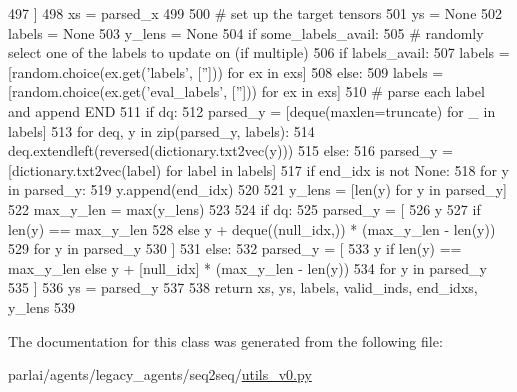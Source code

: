 \begin{DoxyCode}
497             ]
498         xs = parsed\_x
499 
500         \textcolor{comment}{# set up the target tensors}
501         ys = \textcolor{keywordtype}{None}
502         labels = \textcolor{keywordtype}{None}
503         y\_lens = \textcolor{keywordtype}{None}
504         \textcolor{keywordflow}{if} some\_labels\_avail:
505             \textcolor{comment}{# randomly select one of the labels to update on (if multiple)}
506             \textcolor{keywordflow}{if} labels\_avail:
507                 labels = [random.choice(ex.get(\textcolor{stringliteral}{'labels'}, [\textcolor{stringliteral}{''}])) \textcolor{keywordflow}{for} ex \textcolor{keywordflow}{in} exs]
508             \textcolor{keywordflow}{else}:
509                 labels = [random.choice(ex.get(\textcolor{stringliteral}{'eval\_labels'}, [\textcolor{stringliteral}{''}])) \textcolor{keywordflow}{for} ex \textcolor{keywordflow}{in} exs]
510             \textcolor{comment}{# parse each label and append END}
511             \textcolor{keywordflow}{if} dq:
512                 parsed\_y = [deque(maxlen=truncate) \textcolor{keywordflow}{for} \_ \textcolor{keywordflow}{in} labels]
513                 \textcolor{keywordflow}{for} deq, y \textcolor{keywordflow}{in} zip(parsed\_y, labels):
514                     deq.extendleft(reversed(dictionary.txt2vec(y)))
515             \textcolor{keywordflow}{else}:
516                 parsed\_y = [dictionary.txt2vec(label) \textcolor{keywordflow}{for} label \textcolor{keywordflow}{in} labels]
517             \textcolor{keywordflow}{if} end\_idx \textcolor{keywordflow}{is} \textcolor{keywordflow}{not} \textcolor{keywordtype}{None}:
518                 \textcolor{keywordflow}{for} y \textcolor{keywordflow}{in} parsed\_y:
519                     y.append(end\_idx)
520 
521             y\_lens = [len(y) \textcolor{keywordflow}{for} y \textcolor{keywordflow}{in} parsed\_y]
522             max\_y\_len = max(y\_lens)
523 
524             \textcolor{keywordflow}{if} dq:
525                 parsed\_y = [
526                     y
527                     \textcolor{keywordflow}{if} len(y) == max\_y\_len
528                     \textcolor{keywordflow}{else} y + deque((null\_idx,)) * (max\_y\_len - len(y))
529                     \textcolor{keywordflow}{for} y \textcolor{keywordflow}{in} parsed\_y
530                 ]
531             \textcolor{keywordflow}{else}:
532                 parsed\_y = [
533                     y \textcolor{keywordflow}{if} len(y) == max\_y\_len \textcolor{keywordflow}{else} y + [null\_idx] * (max\_y\_len - len(y))
534                     \textcolor{keywordflow}{for} y \textcolor{keywordflow}{in} parsed\_y
535                 ]
536             ys = parsed\_y
537 
538         \textcolor{keywordflow}{return} xs, ys, labels, valid\_inds, end\_idxs, y\_lens
539 
\end{DoxyCode}


The documentation for this class was generated from the following file\+:\begin{DoxyCompactItemize}
\item 
parlai/agents/legacy\+\_\+agents/seq2seq/\hyperlink{utils__v0_8py}{utils\+\_\+v0.\+py}\end{DoxyCompactItemize}
